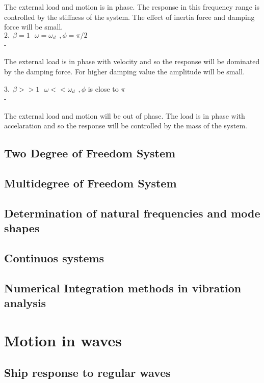 \documentclass{book}
\begin{document}
The external load and motion is in phase. The response in this frequency range is controlled 
by the stiffness of the system. The effect of inertia force and damping force will be 
small.\\

\( 2.\ \ \beta = 1 \ \ \ \omega = \omega_d \ \ , \phi = \pi/2 \) \\ - 

The external load is in phase with velocity and so the response will be dominated by the damping force. For higher damping value the amplitude will be small.

\( 3.\ \ \beta >> 1 \ \ \ \omega << \omega_d \ \ , \phi \) is close to \(\pi\) \\ - 

The external load and motion will be out of phase.  The load is in phase with accelaration and so the response will be controlled by the mass of the system.

\chapter{Two Degree of Freedom System}
\chapter{Multidegree of Freedom System}
\chapter{Determination of natural frequencies and mode shapes}
\chapter{Continuos systems}
\chapter{Numerical Integration methods in vibration analysis}

\part{Motion in waves}
\chapter{Ship response to regular waves}
\end{document}
